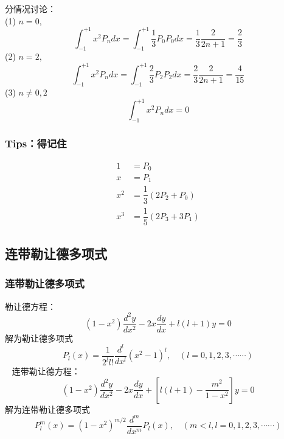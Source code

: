 \begin{frame}
	分情况讨论：\\
	(1)  $n=0$, 
	\begin{equation*}
		\int_{-1}^{+1} x^2 P _{n} dx  =   \int_{-1}^{+1} \dfrac{1}{3}P_0  P _{0} dx=\dfrac{1}{3} \frac{2}{2n+1}  = \dfrac{2}{3}	
	\end{equation*}	
	(2)  $n=2$, 
	\begin{equation*}
		\int_{-1}^{+1} x^2 P _{n} dx  =   \int_{-1}^{+1} \dfrac{2}{3}P_2  P _{2} dx= \dfrac{2}{3}\frac{2}{2n+1}  = \dfrac{4}{15}	
	\end{equation*}	
	(3) $ n\neq 0,2$
	\begin{equation*}
		\int_{-1}^{+1} x^2 P _{n} dx  =  0	
	\end{equation*}
\end{frame}	

\begin{frame}
	\frametitle{Tips：得记住}	
	\begin{equation*}
		\begin{split}
		1&= P_0 \\
		x&=P_1\\
	    x^2&=\dfrac{1}{3}(2P_2+P_0)\\
		x^3&=\dfrac{1}{5}(2P_3+3P_1)		
		\end{split}
	\end{equation*}
\end{frame}	

\subsection{连带勒让德多项式}

\begin{frame}
	\frametitle{连带勒让德多项式}
	勒让德方程：
	\begin{equation*}
		\left(1-x^{2}\right) \frac{d^{2} y}{d x^{2}}-2 x \frac{d y}{d x}+l(l+1)y=0
	\end{equation*}		
	解为勒让德多项式
	\begin{equation*}
		P_{l}(x)=\frac{1}{2^{l} l !} \frac{d^{l}}{d x^{l}}\left(x^{2}-1\right)^{l}, \quad(l=0,1,2,3, \cdots \cdots)
	\end{equation*}	 
	连带勒让德方程：
	\begin{equation*}
		\left(1-x^{2}\right) \frac{d^{2} y}{d x^{2}}-2 x \frac{d y}{d x}+\left[l(l+1)-\frac{m^{2}}{1-x^{2}}\right] y=0
	\end{equation*}		
	解为连带勒让德多项式
	\begin{equation*}
		P^m  _{l}(x)= (1-x^2) ^ {m/2 } \frac{d^{m}}{d x^{m} } P_l(x),  \quad(m < l, l=0,1,2,3, \cdots \cdots)
	\end{equation*}	 
\end{frame}	

